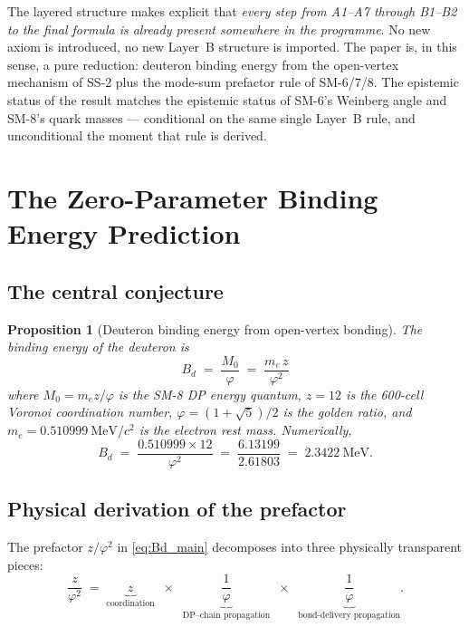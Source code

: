 \documentclass[11pt,letterpaper]{article}
\newtheorem{proposition}[theorem]{Proposition}
\newcommand{\phig}{\varphi}
\newcommand{\Mzero}{M_0}
\newcommand{\Bd}{B_{d}}
\begin{document}
The layered structure makes explicit that \emph{every step from A1--A7 through B1--B2 to the final formula is already present somewhere in the programme}. No new axiom is introduced, no new Layer~B structure is imported. The paper is, in this sense, a pure reduction: deuteron binding energy from the open-vertex mechanism of SS-2 plus the mode-sum prefactor rule of SM-6/7/8. The epistemic status of the result matches the epistemic status of SM-6's Weinberg angle and SM-8's quark masses --- conditional on the same single Layer~B rule, and unconditional the moment that rule is derived.

\section{The Zero-Parameter Binding Energy Prediction}
\label{sec:binding}

\subsection{The central conjecture}

\begin{proposition}[Deuteron binding energy from open-vertex bonding]
\label{prop:central}
The binding energy of the deuteron is
\begin{equation}
\boxed{\;\Bd \;=\; \frac{\Mzero}{\phig} \;=\; \frac{m_e\, z}{\phig^{2}}\;}
\label{eq:Bd_main}
\end{equation}
where $\Mzero = m_e z/\phig$ is the SM-8 DP energy quantum, $z = 12$ is the 600-cell Voronoi coordination number, $\phig = (1+\sqrt{5})/2$ is the golden ratio, and $m_e = 0.510999~\mathrm{MeV}/c^2$ is the electron rest mass. Numerically,
\begin{equation}
\Bd \;=\; \frac{0.510999 \times 12}{\phig^2} \;=\; \frac{6.13199}{2.61803} \;=\; 2.3422~\mathrm{MeV}.
\label{eq:Bd_num}
\end{equation}
\end{proposition}

\subsection{Physical derivation of the prefactor}
\label{sec:prefactor}

The prefactor $z/\phig^2$ in \eqref{eq:Bd_main} decomposes into three physically transparent pieces:
\begin{equation}
\frac{z}{\phig^2}
\;=\;
\underbrace{\;z\;}_{\text{coordination}}
\;\;\times\;\;
\underbrace{\frac{1}{\phig}}_{\text{DP--chain propagation}}
\;\;\times\;\;
\underbrace{\frac{1}{\phig}}_{\text{bond-delivery propagation}}.
\label{eq:prefactor}
\end{equation}
\end{document}
